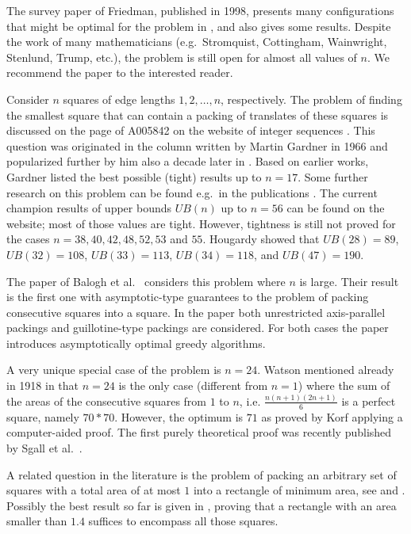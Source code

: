 \documentclass[twoside]{amsart}
\begin{document}
The survey paper \cite{Friedpack} of Friedman, published in 1998, presents many configurations that might be optimal for the problem in \cite{EG75},
and also gives some results. Despite the work of many mathematicians (e.g.\ Stromquist, Cottingham, Wainwright, Stenlund, Trump, etc.), the problem is still open for almost all values of $n$. We recommend the paper \cite{Friedpack} to the interested reader.

Consider $n$ squares of edge lengths $1, 2, \ldots, n$, respectively. The problem of finding the smallest square that can contain a packing of translates of these squares is discussed on the page of A005842 on the website of integer sequences \cite{1}. This question was originated in the
column written by Martin Gardner in 1966 \cite{Gardner66} and popularized further by him also a decade later in \cite{Gardner75}.
Based on earlier works, Gardner \cite{Gardner75} listed the best possible (tight)
results up to $n=17$. 
Some further research on this problem can be found e.g.\ in the
publications \cite{Korf03, Korf04, Hougardy12}.
The current champion results of upper bounds $UB(n)$ up to $n=56$ can be found on the
\cite{1} website; most of
those values are tight. However, tightness is still not proved for the cases
$n=38,40,42,48,52,53$ and $55$. Hougardy \cite{Hougardy12} showed that
$UB(28)=89$, $UB(32)=108$, $UB(33)=113$, $UB(34)=118$, and $UB(47)=190$.

The paper of Balogh et al.\ \cite{Balogh22} considers this problem where $n$ is large. 
Their result is the first one with asymptotic-type guarantees to the problem of packing consecutive squares into a square. In the paper both
unrestricted axis-parallel packings and guillotine-type packings are
considered. For both cases the paper introduces asymptotically optimal greedy algorithms.

A very unique special case of the problem is $n=24$. Watson mentioned already
in 1918 in \cite{Watson1918} that $n=24$ is the only case (different from
$n=1$) where the sum of the areas of the consecutive squares from $1$ to $n$,
i.e. $\frac{n(n+1)(2n+1)}{6}$ is a perfect square, namely $70\ast70$. However, the
optimum is $71$ as proved by Korf \cite{Korf04} applying a computer-aided
proof. The first purely theoretical proof was recently published by Sgall et
al.\ \cite{Sgall}.

A related question in the literature is the problem of packing an arbitrary
set of squares with a total area of at most $1$ into a rectangle of minimum
area, see \cite{MM67} and \cite{Kleitman75}. Possibly the best result so far
is given in \cite{Hougardy11}, proving that a rectangle with an area smaller
than $1.4$ suffices to encompass all those squares.
\end{document}
